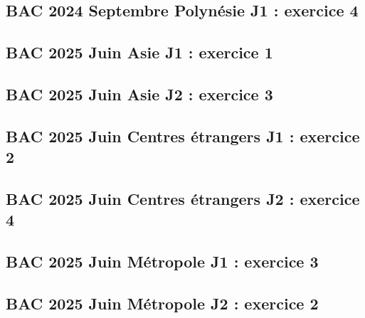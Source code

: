 \documentclass[lang=fr,edition=teacher,layout=sheet]{mxbook}
\begin{document}
\begingroup\endgroup
\par\bigskip
{}\subsection*{BAC 2024 Septembre Polynésie J1 : exercice 4}
\begingroup\endgroup
\par\bigskip
{}\subsection*{BAC 2025 Juin Asie J1 : exercice 1}
\begingroup\endgroup
\par\bigskip
{}\subsection*{BAC 2025 Juin Asie J2 : exercice 3}
\begingroup\endgroup
\par\bigskip
{}\subsection*{BAC 2025 Juin Centres étrangers J1 : exercice 2}
\begingroup\endgroup
\par\bigskip
{}\subsection*{BAC 2025 Juin Centres étrangers J2 : exercice 4}
\begingroup\endgroup
\par\bigskip
{}\subsection*{BAC 2025 Juin Métropole J1 : exercice 3}
\begingroup\endgroup
\par\bigskip
{}\subsection*{BAC 2025 Juin Métropole J2 : exercice 2}
\end{document}
